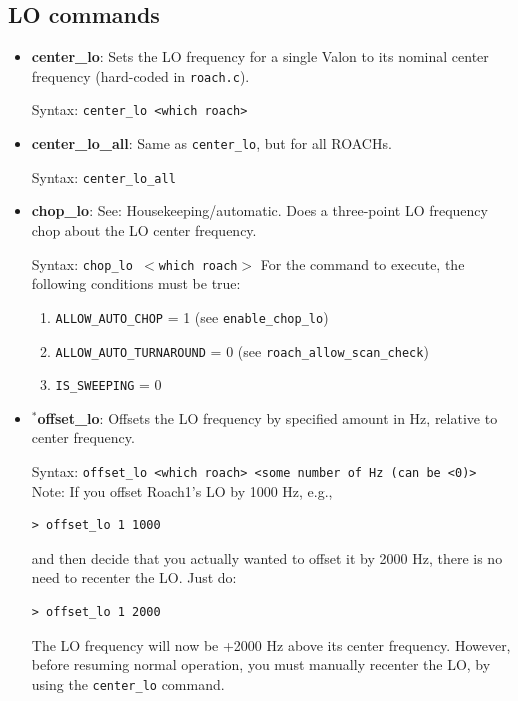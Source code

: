 \subsection{LO commands}

\begin{itemize}[leftmargin=*,label={}]

\item \textbf{center\_lo}: Sets the LO frequency for a single Valon to its nominal center frequency (hard-coded in \texttt{roach.c}).

Syntax: \texttt{center\_lo <which roach>}

\item \textbf{center\_lo\_all}: Same as \texttt{center\_lo}, but for all ROACHs.

Syntax: \texttt{center\_lo\_all}

\item \textbf{chop\_lo}: See: Housekeeping/automatic. Does a three-point LO frequency chop about the LO center frequency.

Syntax: \texttt{chop\_lo $<$which roach$>$}
For the command to execute, the following conditions must be true:

\begin{enumerate}
\item \texttt{ALLOW\_AUTO\_CHOP} = 1 (see \texttt{enable\_chop\_lo})
\item \texttt{ALLOW\_AUTO\_TURNAROUND} = 0 (see \texttt{roach\_allow\_scan\_check})
\item \texttt{IS\_SWEEPING} = 0
\end{enumerate}

\item$^{*}$\textbf{offset\_lo}: Offsets the LO frequency by specified amount in Hz, relative to center frequency.\

Syntax: \texttt{offset\_lo <which roach> <some number of Hz (can be <0)>}\\
Note: If you offset Roach1’s LO by 1000 Hz, e.g.,
\begin{verbatim}
> offset_lo 1 1000
\end{verbatim}
and then decide that you actually wanted to offset it by 2000 Hz, there is no need to recenter the LO. Just do:
\begin{verbatim}
> offset_lo 1 2000
\end{verbatim}
The LO frequency will now be +2000 Hz above its center frequency. However, before resuming normal operation, you must manually recenter the LO, by using the \texttt{center\_lo} command.


\end{itemize}
